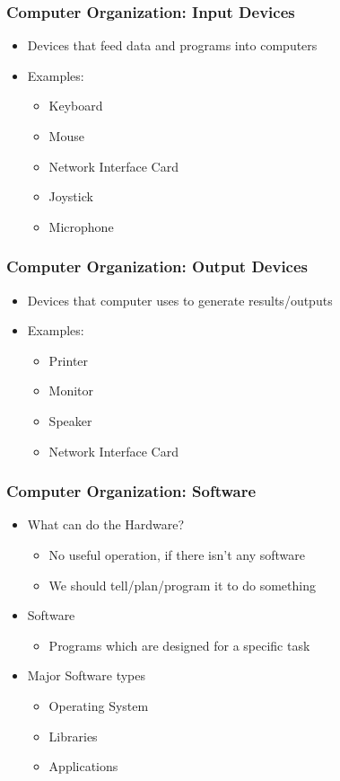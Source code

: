 \documentclass{../c-lecture}
\begin{document}
\begin{frame}
  \frametitle{Computer Organization: Input Devices}
  \begin{itemize}
    \item Devices that feed data and programs into computers
    \item Examples:
    \begin{itemize}
      \item Keyboard
      \item Mouse
      \item Network Interface Card
      \item Joystick
      \item Microphone
    \end{itemize}
  \end{itemize}
\end{frame}

\begin{frame}
  \frametitle{Computer Organization: Output Devices}
  \begin{itemize}
    \item Devices that computer uses to generate results/outputs
    \item Examples:
    \begin{itemize}
      \item Printer
      \item Monitor
      \item Speaker
      \item Network Interface Card
    \end{itemize}
  \end{itemize}
\end{frame}

\begin{frame}
  \frametitle{Computer Organization: Software}
  \begin{itemize}
    \item What can do the Hardware?
    \begin{itemize}
      \item No useful operation, if there isn’t any software
      \item We should tell/plan/program it to do something
    \end{itemize}
    \item Software
    \begin{itemize}
      \item Programs which are designed for a specific task
    \end{itemize}
    \item Major Software types
    \begin{itemize}
      \item Operating System
      \item Libraries
      \item Applications
    \end{itemize}
  \end{itemize}
\end{frame}
\end{document}
